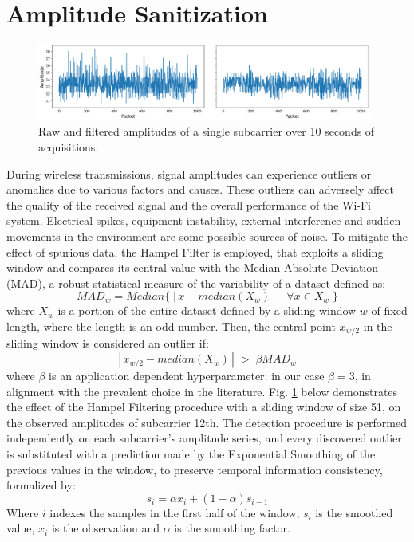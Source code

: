 \documentclass[binding=0.7cm, oneside]{sapthesis}
\begin{document}
\section{Amplitude Sanitization}
\begin{figure}[b]
    \centering
    \includegraphics[width=0.98\textwidth]{images/Hampel2.png}
    \caption{Raw and filtered amplitudes of a single subcarrier over 10 seconds of acquisitions.}
    \label{fig:Hampel1}
\end{figure}
During wireless transmissions, signal amplitudes can experience outliers or anomalies due to various factors and causes. These outliers can adversely
affect the quality of the received signal and the overall performance of the Wi-Fi system. Electrical spikes, equipment instability, external interference and
sudden movements in the environment are some possible sources of noise. To mitigate the effect of spurious data, the Hampel Filter \cite{hampel_ID, Gait_hampel_pca} is employed,
that exploits a sliding window and compares its central value with the Median Absolute Deviation (MAD), a robust statistical measure of the variability of a dataset defined as:
$$ MAD_{w} = Median\{\;|\,x - median(X_{w})\,|\quad \forall x \in X_{w}\;\} $$
where $X_{w}$ is a portion of the entire dataset defined by a sliding window $w$ of fixed length, where the length is an odd number. Then, the central point $x_{w/2}$ in the sliding window
is considered an outlier if:
$$|\,x_{w/2} - median(X_{w})\,|\; >\; \beta MAD_{w}$$
where $\beta$ is an application dependent hyperparameter: in our case $\beta = 3$, in alignment with the prevalent choice in the literature. Fig. \ref{fig:Hampel1} below
demonstrates the effect of the Hampel Filtering procedure with a sliding window of size 51, on the observed amplitudes of subcarrier 12th.
The detection procedure is performed independently on each subcarrier’s amplitude series, and every discovered outlier is substituted
with a prediction made by the Exponential Smoothing of the previous values in the window, to preserve temporal information consistency, formalized by:
$$ s_i = \alpha x_i + (1-\alpha)s_{i-1}$$
Where $i$ indexes the samples in the first half of the window, $s_i$ is the smoothed value, $x_i$ is the observation and $\alpha$ is the smoothing factor.
\end{document}
